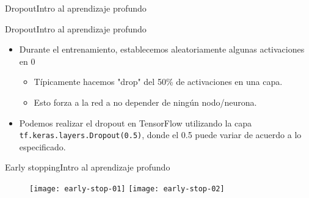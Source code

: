 \documentclass[10pt,border=3pt,tikz]{beamer}
\begin{document}
\begin{frame}{Dropout}{Intro al aprendizaje profundo}
    \end{frame}
    
    \begin{frame}{Dropout}{Intro al aprendizaje profundo}
        \begin{itemize}
            \item Durante el entrenamiento, establecemos aleatoriamente algunas activaciones en 0
            \begin{itemize}
                \item Típicamente hacemos "drop" del 50\% de activaciones en una capa.
                \item Esto forza a la red a no depender de ningún nodo/neurona.
            \end{itemize}
            \item Podemos realizar el dropout en TensorFlow utilizando la capa \texttt{tf.keras.layers.Dropout(0.5)}, donde el 0.5 puede variar de acuerdo a lo especificado.
        \end{itemize}
    \end{frame}
    
    \begin{frame}{Early stopping}{Intro al aprendizaje profundo}
        \begin{figure}
            \centering
            \texttt{[image: early-stop-01]}
            \texttt{[image: early-stop-02]}
        \end{figure}
    \end{frame}
    
\end{document}
